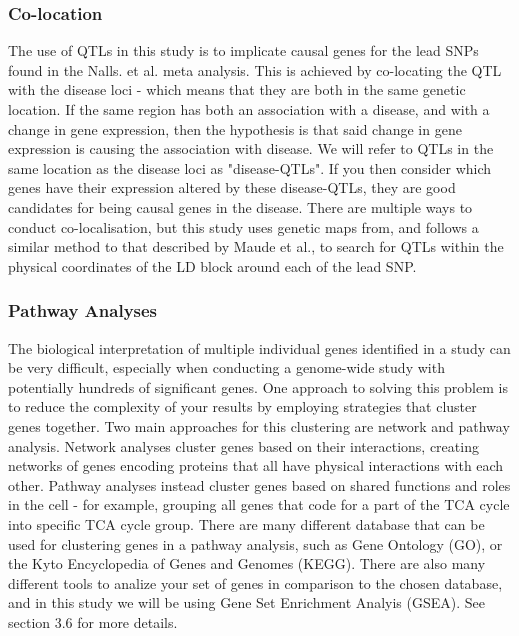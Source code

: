 \documentclass{article}
\begin{document}
\subsubsection{Co-location}
The use of QTLs in this study is to implicate causal genes for the lead SNPs found in the Nalls. et al.\cite{Nalls2019IdentificationStudies} meta analysis. This is achieved by co-locating the QTL with the disease loci - which means that they are both in the same genetic location. If the same region has both an association with a disease, and with a change in gene expression, then the hypothesis is that said change in gene expression is causing the association with disease. We will refer to QTLs in the same location as the disease loci as "disease-QTLs". If you then consider which genes have their expression altered by these disease-QTLs, they are good candidates for being causal genes in the disease. 
There are multiple ways to conduct co-localisation, but this study uses genetic maps from\cite{Maniatis2004PositionalDisequilibrium.}, and follows a similar method to that described by Maude et al.\cite{Maude2021NewDiabetes.}, to search for QTLs within the physical coordinates of the LD block around each of the lead SNP.
\subsubsection{Pathway Analyses}
The biological interpretation of multiple individual genes identified in a study can be very difficult, especially when conducting a genome-wide study with potentially hundreds of significant genes. One approach to solving this problem is to reduce the complexity of your results by employing strategies that cluster genes together. Two main approaches for this clustering are network and pathway analysis. Network analyses cluster genes based on their interactions, creating networks of genes encoding proteins that all have physical interactions with each other\cite{Maayan2011IntroductionBiology}. Pathway analyses instead cluster genes based on shared functions and roles in the cell\cite{Garcia-Campos2015PathwayArt} - for example, grouping all genes that code for a part of the TCA cycle into specific TCA cycle group.
There are many different database that can be used for clustering genes in a pathway analysis, such as Gene Ontology (GO)\cite{Ashburner2000GeneBiology}, or the Kyto Encyclopedia of Genes and Genomes (KEGG)\cite{Kanehisa2016KEGGAnnotation}. There are also many different tools to analize your set of genes in comparison to the chosen database, and in this study we will be using Gene Set Enrichment Analyis (GSEA)\cite{Subramanian2005GeneProfiles}. See section 3.6 for more details.
\end{document}
